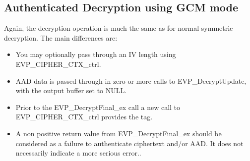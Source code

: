 \documentclass{article}
\begin{document}
\subsection{Authenticated Decryption using GCM mode}
Again, the decryption operation is much the same as for normal symmetric decryption. The main differences are:
\begin{itemize}
\item You may optionally pass through an IV length using EVP\_CIPHER\_CTX\_ctrl.
\item AAD data is passed through in zero or more calls to EVP\_DecryptUpdate, with the output buffer set to NULL.
\item Prior to the EVP\_DecryptFinal\_ex call a new call to EVP\_CIPHER\_CTX\_ctrl provides the tag.
\item A non positive return value from EVP\_DecryptFinal\_ex should be considered as a failure to authenticate ciphertext and/or AAD. It does not necessarily indicate a more serious error..
\end{itemize}
\end{document}
